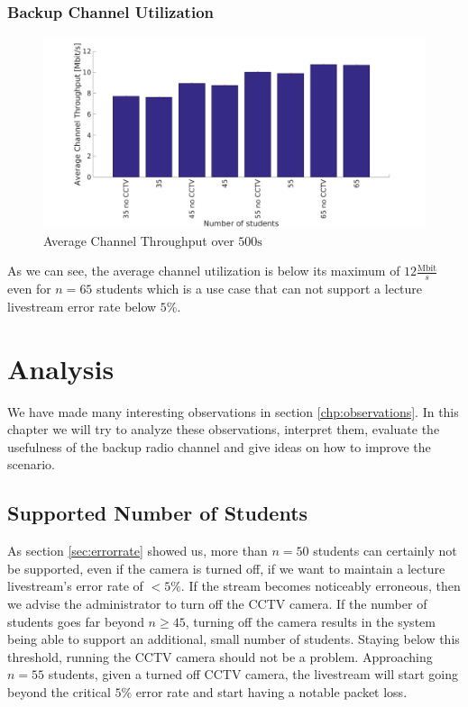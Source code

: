 \documentclass[a4paper]{scrreprt}
\begin{document}
		\subsection{Backup Channel Utilization}
			\begin{figure}[H]
				\center\includegraphics[width=\textwidth]{../Results_Analysis/ChannelThroughput/channel_throughput.png}
				\caption{Average Channel Throughput over $500\text{s}$}
				\label{fig:channelthroughput}
			\end{figure}	
			
			As we can see, the average channel utilization is below its maximum of $12\frac{\text{Mbit}}{s}$ even for $n=65$ students which is a use case that can not support a lecture livestream error rate below $5\%$.	
		
	\chapter{Analysis}\label{sec:analysis}
		We have made many interesting observations in section \ref{chp:observations}. In this chapter we will try to analyze these observations, interpret them, evaluate the usefulness of the backup radio channel and give ideas on how to improve the scenario.				
		
		\section{Supported Number of Students}
		As section \ref{sec:errorrate} showed us, more than $n=50$ students can certainly not be supported, even if the camera is turned off, if we want to maintain a lecture livestream's error rate of $<5\%$. If the stream becomes noticeably erroneous, then we advise the administrator to turn off the CCTV camera. If the number of students goes far beyond $n\geq 45$, turning off the camera results in the system being able to support an additional, small number of students. Staying below this threshold, running the CCTV camera should not be a problem. Approaching $n=55$ students, given a turned off CCTV camera, the livestream will start going beyond the critical $5\%$ error rate and start having a notable packet loss.	
		
\end{document}
